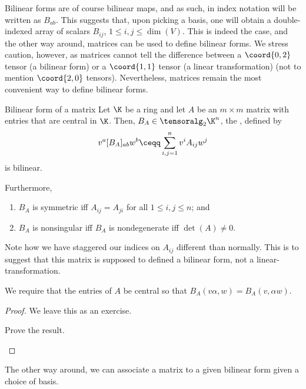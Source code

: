 Bilinear forms are of course bilinear maps, and as such, in index notation will be written as $B_{ab}$.  This suggests that, upon picking a basis, one will obtain a double-indexed array of scalars $B_{ij}$, $1\leq i,j\leq \dim (V)$.  This is indeed the case, and the other way around, matrices can be used to define bilinear forms.  We stress caution, however, as matrices cannot tell the difference between a $\coord{0,2}$ tensor (a bilinear form) or a $\coord{1,1}$ tensor (a linear transformation) (not to mention $\coord{2,0}$ tensors).  Nevertheless, matrices remain the most convenient way to define bilinear forms.
\begin{prp}{Bilinear form of a matrix}{}
	Let $\K$ be a ring and let $A$ be an $m\times m$ matrix with entries that are central in $\K$.  Then, $B_A\in \tensoralg _2\K ^n$, the , defined by
	\begin{equation}
		v^a[B_A]_{ab}w^b\ceqq \sum _{i,j=1}^nv^iA_{ij}w^j
	\end{equation}
	is bilinear.
	
	Furthermore,
	\begin{enumerate}
		\item $B_A$ is symmetric iff $A_{ij}=A_{ji}$ for all $1\leq i,j\leq n$; and
		\item $B_A$ is nonsingular iff $B_A$ is nondegenerate iff $\det (A)\neq 0$.
	\end{enumerate}
	\begin{rmk}
		Note how we have staggered our indices on $A_{ij}$ different than normally.  This is to suggest that this matrix is supposed to defined a bilinear form, not a linear-transformation.
	\end{rmk}
	\begin{rmk}
		We require that the entries of $A$ be central so that $B_A(v\alpha ,w)=B_A(v,\alpha w)$.
	\end{rmk}
	\begin{proof}
		We leave this as an exercise.
		\begin{exr}[breakable=false]{}{}
			Prove the result.
		\end{exr}
	\end{proof}
\end{prp}
The other way around, we can associate a matrix to a given bilinear form given a choice of basis.
